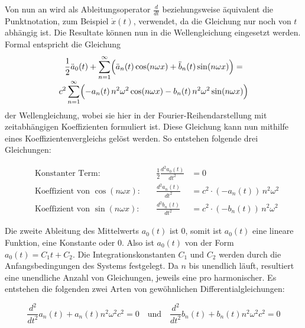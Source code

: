 Von nun an wird als Ableitungsoperator $\frac{d}{dt}$ beziehungsweise äquivalent die Punktnotation, zum Beispiel $\dot{x}(t)$, verwendet, da die Gleichung nur noch von $t$ abhängig ist. Die Resultate können nun in die Wellengleichung eingesetzt werden. 
Formal entspricht die Gleichung
\begin{multline}
	\frac{1}{2}\ddot{a}_0(t)
	+ \sum_{n=1}^{\infty}\Bigl(
	\ddot{a}_n(t)\cos(n\omega x)
	+ \ddot{b}_n(t)\sin(n\omega x)
	\Bigr)
	= \\[-0.8ex]
	c^2 \sum_{n=1}^{\infty}\Bigl(
	-a_n(t)\,n^2\omega^2\cos(n\omega x)
	-b_n(t)\,n^2\omega^2\sin(n\omega x)
	\Bigr)
\end{multline}
der Wellengleichung, wobei sie hier in der Fourier-Reihendarstellung mit zeitabhängigen Koeffizienten formuliert ist.
Diese Gleichung kann nun mithilfe eines Koeffizientenvergleichs gelöst werden.
So entstehen folgende drei Gleichungen:

\begin{equation}
	\begin{alignedat}{2}
		&\text{Konstanter Term:} 
		&\quad \frac{1}{2} \frac{d^2 a_0(t)}{dt^2} &= 0 \\[0.8em]
		&\text{Koeffizient von }\cos(n\omega x): 
		&\quad \frac{d^2 a_n(t)}{dt^2} &= c^2 \cdot (-a_n(t))\,n^2\omega^2 \\[0.8em]
		&\text{Koeffizient von }\sin(n\omega x): 
		&\quad \frac{d^2 b_n(t)}{dt^2} &= c^2 \cdot (-b_n(t))\,n^2\omega^2
	\end{alignedat}
\end{equation}

Die zweite Ableitung des Mittelwerts $a_0(t)$ ist 0, somit ist $a_0(t)$ eine lineare Funktion, eine Konstante oder 0. Also ist $a_0(t)$ von der Form $a_0(t)=C_1 t + C_2$.
Die Integrationskonstanten $C_1$ und $C_2$ werden durch die Anfangsbedingungen des Systems festgelegt.
Da $n$ bis unendlich läuft, resultiert eine unendliche Anzahl von Gleichungen, jeweils eine pro harmonischer.
Es entstehen die folgenden zwei Arten von gewöhnlichen Differentialgleichungen:

\begin{equation}\label{eq:ODE_Wellengleichung}
	\frac{d^2}{dt^2} a_n(t) + a_n(t) n^2 \omega^2 c^2 = 0
	  \quad   \text{und} \quad  \frac{d^2}{dt^2} b_n(t) + b_n(t) n^2 \omega^2 c^2 = 0
\end{equation}


